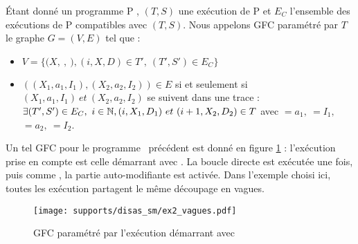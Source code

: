 \begin{defi}
 Étant donné un programme P \sm, $(T, S)$ une exécution de P et $E_C$ l'ensemble des exécutions de P compatibles avec $(T, S)$.
 Nous appelons GFC paramétré par $T$ le graphe $G=(V, E)$ tel que :
 \begin{itemize}
  \item $V=\{(X,\ $$,\ $$), (i, X, D)\in T',\ (T', S')\in E_C \}$%
  \item $((X_1, a_1, I_1), (X_2, a_2, I_2))\in E$ si et seulement si $(X_1, a_1,
I_1)\ et\ (X_2, a_2, I_2)$ se suivent dans une trace : $\exists (T', S')\in
E_C,\ i\in \mathbb N, (i, X_1, D_1)\ et\ (i+1, X_2, D_2)\in T$ avec $=a_1,\ $$=I_1,$~$=a_2,\ $$=I_2$.
 \end{itemize}
\label{def:cfg_param_sm}
\end{defi}


Un tel GFC pour le programme \sm\ précédent est donné en figure \ref{fig:sm_cfg_vagues} : l'exécution prise en compte est celle démarrant avec . La boucle directe est exécutée une fois, puis comme , la partie auto-modifiante est activée. Dans l'exemple choisi ici, toutes les exécution partagent le même découpage en vagues.


\begin{figure}[h]
\begin{center}
  \texttt{[image: supports/disas\_sm/ex2\_vagues.pdf]}
\end{center}
\caption{GFC paramétré par l'exécution démarrant avec }
\label{fig:sm_cfg_vagues}
\end{figure}


